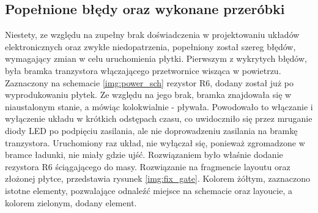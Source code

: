 \subsection{Popełnione błędy oraz wykonane przeróbki}
\label{sub:mistakes}
Niestety, ze względu na zupełny brak doświadczenia w projektowaniu układów elektronicznych oraz zwykłe niedopatrzenia, popełniony został szereg błędów, wymagający zmian w celu uruchomienia płytki.
\newline \newline
Pierwszym z wykrytych błędów, była bramka tranzystora włączającego przetwornice wisząca w powietrzu. Zaznaczony na schemacie \ref{img:power_sch} rezystor R6, dodany został już po wyprodukowaniu płytek. Ze względu na jego brak, bramka znajdowała się w niaustalonym stanie, a mówiąc kolokwialnie - pływała. Powodowało to włączanie i wyłączenie układu w krótkich odstępach czasu, co uwidoczniło się przez mruganie diody LED po podpięciu zasilania, ale nie doprowadzeniu zasilania na bramkę tranzystora. Uruchomiony raz układ, nie wyłączał się, ponieważ zgromadzone w bramce ładunki, nie miały gdzie ujść. Rozwiązaniem było właśnie dodanie rezystora R6 ściągającego do masy. Rozwiązanie na fragmencie layoutu oraz złożonej płytce, przedstawia rysunek \ref{img:fix_gate}. Kolorem żółtym, zaznaczono istotne elementy, pozwalające odnaleźć miejsce na schemacie oraz layoucie, a kolorem zielonym, dodany element.

